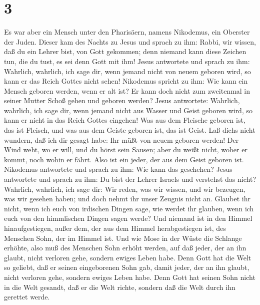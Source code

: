 \hypertarget{section-2}{%
\section{3}\label{section-2}}

 Es war aber ein Mensch unter den Pharisäern, namens
Nikodemus, ein Oberster der Juden.  Dieser kam des Nachts
zu Jesus und sprach zu ihm: Rabbi, wir wissen, daß du ein Lehrer bist,
von Gott gekommen; denn niemand kann diese Zeichen tun, die du tust, es
sei denn Gott mit ihm!  Jesus antwortete und sprach zu
ihm: Wahrlich, wahrlich, ich sage dir, wenn jemand nicht von neuem
geboren wird, so kann er das Reich Gottes nicht sehen! 
Nikodemus spricht zu ihm: Wie kann ein Mensch geboren werden, wenn er
alt ist? Er kann doch nicht zum zweitenmal in seiner Mutter Schoß gehen
und geboren werden?  Jesus antwortete: Wahrlich, wahrlich,
ich sage dir, wenn jemand nicht aus Wasser und Geist geboren wird, so
kann er nicht in das Reich Gottes eingehen!  Was aus dem
Fleische geboren ist, das ist Fleisch, und was aus dem Geiste geboren
ist, das ist Geist.  Laß dich\textquotesingle s nicht
wundern, daß ich dir gesagt habe: Ihr müßt von neuem geboren werden!
 Der Wind weht, wo er will, und du hörst sein Sausen; aber
du weißt nicht, woher er kommt, noch wohin er fährt. Also ist ein jeder,
der aus dem Geist geboren ist.  Nikodemus antwortete und
sprach zu ihm: Wie kann das geschehen?  Jesus antwortete
und sprach zu ihm: Du bist der Lehrer Israels und verstehst das nicht?
 Wahrlich, wahrlich, ich sage dir: Wir reden, was wir
wissen, und wir bezeugen, was wir gesehen haben; und doch nehmt ihr
unser Zeugnis nicht an.  Glaubet ihr nicht, wenn ich euch
von irdischen Dingen sage, wie werdet ihr glauben, wenn ich euch von den
himmlischen Dingen sagen werde?  Und niemand ist in den
Himmel hinaufgestiegen, außer dem, der aus dem Himmel herabgestiegen
ist, des Menschen Sohn, der im Himmel ist.  Und wie Mose
in der Wüste die Schlange erhöhte, also muß des Menschen Sohn erhöht
werden,  auf daß jeder, der an ihn glaubt, nicht verloren
gehe, sondern ewiges Leben habe.  Denn Gott hat die Welt
so geliebt, daß er seinen eingeborenen Sohn gab, damit jeder, der an ihn
glaubt, nicht verloren gehe, sondern ewiges Leben habe. 
Denn Gott hat seinen Sohn nicht in die Welt gesandt, daß er die Welt
richte, sondern daß die Welt durch ihn gerettet werde. 
